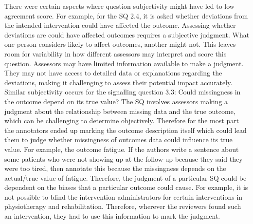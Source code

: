 \documentclass[sn-mathphys,Numbered]{sn-jnl}%
\theoremstyle{thmstyleone}%
\theoremstyle{thmstyletwo}%
\theoremstyle{thmstylethree}%
\begin{document}
There were certain aspects where question subjectivity might have led to low agreement score.
For example, for the SQ 2.4, it is asked whether deviations from the intended intervention could have affected the outcome.
Assessing whether deviations are could have affected outcomes requires a subjective judgment.
What one person considers likely to affect outcomes, another might not.
This leaves room for variability in how different assessors may interpret and score this question.
Assessors may have limited information available to make a judgment.
They may not have access to detailed data or explanations regarding the deviations, making it challenging to assess their potential impact accurately.
Similar subjectivity occurs for the signalling question 3.3: Could missingness in the outcome depend on its true value?
The SQ involves assessors making a judgment about the relationship between missing data and the true outcome, which can be challenging to determine objectively.
Therefore for the most part the annotators ended up marking the outcome description itself which could lead them to judge whether missingness of outcomes data could influence its true value.
For example, the outcome fatigue.
If the authors write a sentence about some patients who were not showing up at the follow-up because they said they were too tired, then annotate this because the missingness depends on the actual/true value of fatigue.
Therefore, the judgment of a particular SQ could be dependent on the biases that a particular outcome could cause.
For example, it is not possible to blind the intervention administrators for certain interventions in physiotherapy and rehabilitation.
Therefore, wherever the reviewers found such an intervention, they had to use this information to mark the judgment.
\end{document}
